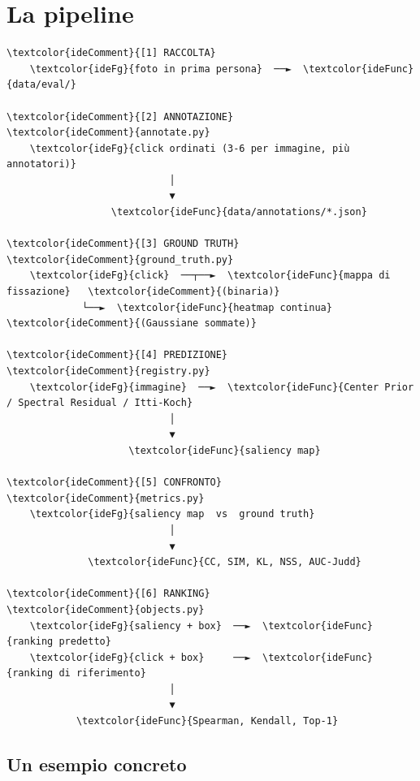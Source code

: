 \section{La pipeline}

\begin{idebox}
\begin{Verbatim}[commandchars=\\\{\},fontsize=\footnotesize]
\textcolor{ideComment}{[1] RACCOLTA}
    \textcolor{ideFg}{foto in prima persona}  ──►  \textcolor{ideFunc}{data/eval/}

\textcolor{ideComment}{[2] ANNOTAZIONE}                                    \textcolor{ideComment}{annotate.py}
    \textcolor{ideFg}{click ordinati (3-6 per immagine, più annotatori)}
                            │
                            ▼
                  \textcolor{ideFunc}{data/annotations/*.json}

\textcolor{ideComment}{[3] GROUND TRUTH}                          \textcolor{ideComment}{ground_truth.py}
    \textcolor{ideFg}{click}  ──┬──►  \textcolor{ideFunc}{mappa di fissazione}   \textcolor{ideComment}{(binaria)}
             └──►  \textcolor{ideFunc}{heatmap continua}      \textcolor{ideComment}{(Gaussiane sommate)}

\textcolor{ideComment}{[4] PREDIZIONE}                              \textcolor{ideComment}{registry.py}
    \textcolor{ideFg}{immagine}  ──►  \textcolor{ideFunc}{Center Prior / Spectral Residual / Itti-Koch}
                            │
                            ▼
                     \textcolor{ideFunc}{saliency map}

\textcolor{ideComment}{[5] CONFRONTO}                                 \textcolor{ideComment}{metrics.py}
    \textcolor{ideFg}{saliency map  vs  ground truth}
                            │
                            ▼
              \textcolor{ideFunc}{CC, SIM, KL, NSS, AUC-Judd}

\textcolor{ideComment}{[6] RANKING}                                   \textcolor{ideComment}{objects.py}
    \textcolor{ideFg}{saliency + box}  ──►  \textcolor{ideFunc}{ranking predetto}
    \textcolor{ideFg}{click + box}     ──►  \textcolor{ideFunc}{ranking di riferimento}
                            │
                            ▼
            \textcolor{ideFunc}{Spearman, Kendall, Top-1}
\end{Verbatim}
\end{idebox}

\subsection{Un esempio concreto}

